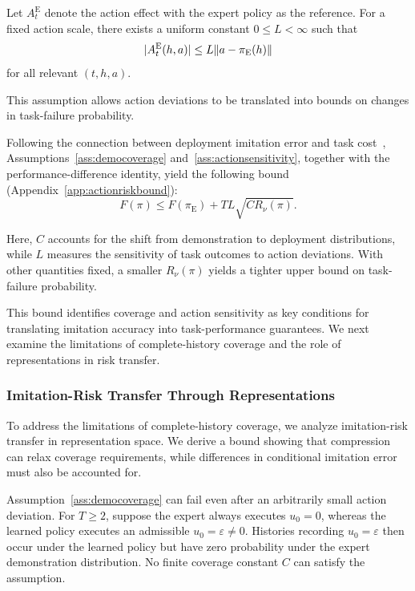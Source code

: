 \begin{assumption}
\label{ass:actionsensitivity}
Let $A_t^{\mathrm E}$ denote the action effect with the expert
policy as the reference.
For a fixed action scale, there exists a uniform constant
$0\le L<\infty$ such that
\[
|A_t^{\mathrm E}(h,a)|
\le L\lVert a-\pi_{\mathrm E}(h)\rVert
\]
for all relevant $(t,h,a)$.
\end{assumption}
This assumption allows action deviations to be translated into bounds
on changes in task-failure probability.

Following the connection between deployment imitation error
and task cost~\cite{ross2011}, Assumptions~\ref{ass:democoverage}
and~\ref{ass:actionsensitivity}, together with the
performance-difference identity, yield the following bound (Appendix~\ref{app:actionriskbound}):
\begin{equation}
 F(\pi)\le F(\pi_{\mathrm E})+TL\sqrt{C R_\nu(\pi)}.
 \label{eq:successbound}
\end{equation}

Here, $C$ accounts for the shift from demonstration to deployment
distributions, while $L$ measures the sensitivity of task outcomes
to action deviations.
With other quantities fixed, a smaller $R_\nu(\pi)$ yields
a tighter upper bound on task-failure probability.

This bound identifies coverage and action sensitivity as key conditions
for translating imitation accuracy into task-performance guarantees.
We next examine the limitations of complete-history coverage
and the role of representations in risk transfer.

\subsubsection{Imitation-Risk Transfer Through Representations}
\label{sec:representationcoverage}
To address the limitations of complete-history coverage, we analyze
imitation-risk transfer in representation space.
We derive a bound showing that compression can relax coverage
requirements, while differences in conditional imitation error must also be accounted for.

Assumption~\ref{ass:democoverage} can fail even after an arbitrarily small action deviation.
For $T\ge2$, suppose the expert always executes $u_0=0$, whereas the learned policy executes
an admissible $u_0=\varepsilon\ne0$.
Histories recording $u_0=\varepsilon$ then occur under the learned policy
but have zero probability under the expert demonstration distribution.
No finite coverage constant $C$ can satisfy the assumption.

